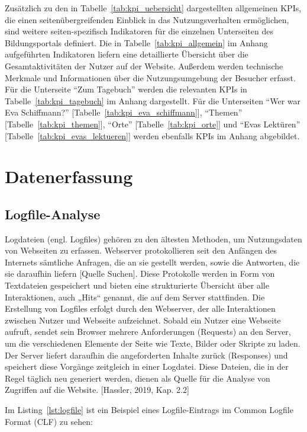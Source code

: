 Zusätzlich zu den in Tabelle~\ref{tab:kpi_uebersicht} dargestellten allgemeinen KPIs, die einen seitenübergreifenden Einblick in das Nutzungsverhalten ermöglichen, sind weitere seiten-spezifisch Indikatoren für die einzelnen Unterseiten des Bildungsportals definiert. Die in Tabelle~\ref{tab:kpi_allgemein} im Anhang aufgeführten Indikatoren liefern eine detaillierte Übersicht über die Gesamtaktivitäten der Nutzer auf der Website. Außerdem werden technische Merkmale und Informationen über die Nutzungsumgebung der Besucher erfasst. Für die Unterseite ``Zum Tagebuch'' werden die relevanten KPIs in Tabelle~\ref{tab:kpi_tagebuch} im Anhang dargestellt. Für die Unterseiten ``Wer war Eva Schiffmann?'' [Tabelle~\ref{tab:kpi_eva_schiffmann}], ``Themen'' [Tabelle~\ref{tab:kpi_themen}], ``Orte'' [Tabelle~\ref{tab:kpi_orte}] und ``Evas Lektüren'' [Tabelle~\ref{tab:kpi_evas_lektueren}] werden ebenfalls KPIs im Anhang abgebildet.


\section{Datenerfassung} %

\subsection{Logfile-Analyse}
Logdateien (engl. Logfiles) gehören zu den ältesten Methoden, um Nutzungsdaten von Webseiten zu erfassen. Webserver protokollieren seit den Anfängen des Internets sämtliche Anfragen, die an sie gestellt werden, sowie die Antworten, die sie daraufhin liefern [Quelle Suchen]. Diese Protokolle werden in Form von Textdateien gespeichert und bieten eine strukturierte Übersicht über alle Interaktionen, auch „Hits“ genannt, die auf dem Server stattfinden. Die Erstellung von Logfiles erfolgt durch den Webserver, der alle Interaktionen zwischen Nutzer und Webseite aufzeichnet. Sobald ein Nutzer eine Webseite aufruft, sendet sein Browser mehrere Anforderungen (Requests) an den Server, um die verschiedenen Elemente der Seite wie Texte, Bilder oder Skripte zu laden. Der Server liefert daraufhin die angeforderten Inhalte zurück (Responses) und speichert diese Vorgänge zeitgleich in einer Logdatei. Diese Dateien, die in der Regel täglich neu generiert werden, dienen als Quelle für die Analyse von Zugriffen auf die Website. [Hassler, 2019, Kap. 2.2] 

Im Listing~\ref{lst:logfile} ist ein Beispiel eines Logfile-Eintrags im Common Logfile Format (CLF) zu sehen: 

